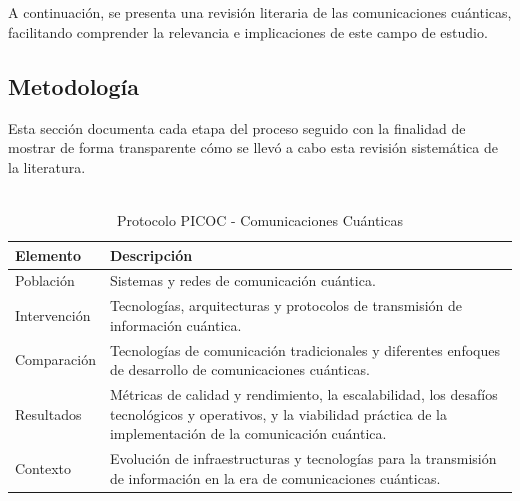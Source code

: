 \chapter{\communicationname}

A continuación, se presenta una revisión literaria de las comunicaciones cuánticas, facilitando comprender la relevancia e implicaciones de este campo de estudio.

\section{Metodología}

Esta sección documenta cada etapa del proceso seguido con la finalidad de mostrar de forma transparente cómo se llevó a cabo esta revisión sistemática de la literatura.

\begin{table}[H]
\centering
\caption[Protocolo PICOC - Ciberseguridad post cuántica]{%
    \vspace{4pt}
    \fontsize{12}{11}\selectfont \\
    Protocolo PICOC - Comunicaciones Cuánticas \\[2pt] %
}
\label{tab:protocolo_picoc_comunicaciones}
\begin{tabular}{@{} l p{10cm} @{}} %
\hline\hline
\textbf{Elemento} & \textbf{Descripción} \\
\hline
Población & Sistemas y redes de comunicación cuántica. \par\vspace{0.5pt} \\
\hline
Intervención & Tecnologías, arquitecturas y protocolos de transmisión de información cuántica. \par\vspace{0.5pt}\\
\hline
Comparación & Tecnologías de comunicación tradicionales y diferentes enfoques de desarrollo de comunicaciones cuánticas.\par\vspace{0.5pt} \\
\hline
Resultados & Métricas de calidad y rendimiento, la escalabilidad, los desafíos tecnológicos y operativos, y la viabilidad práctica de la implementación de la comunicación cuántica. \par\vspace{0.5pt}\\
\hline
Contexto & Evolución de infraestructuras y tecnologías para la transmisión de información en la era de comunicaciones cuánticas. \par\vspace{0.5pt}\\
\hline\hline
\end{tabular}
\end{table}

